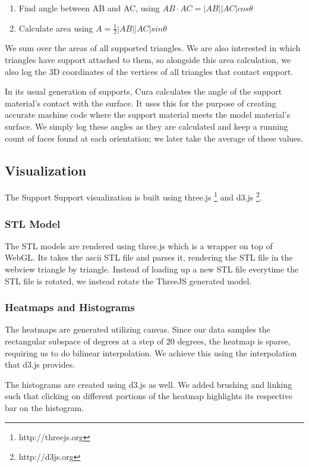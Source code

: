 \documentclass{sigchi}
\begin{document}
\begin{enumerate}
\item Find angle between AB and AC, using $AB \cdot AC = |AB||AC|cos\theta$
\item Calculate area using $A = \frac{1}{2}|AB||AC|sin\theta$
\end{enumerate}

We sum over the areas of all supported triangles.  We are also interested in which triangles have support attached to them, so alongside this area calculation, we also log the 3D coordinates of the vertices of all triangles that contact support.

In its usual generation of supports, Cura calculates the angle of the support material's contact with the surface.  It uses this for the purpose of creating accurate machine code where the support material meets the model material's surface.  We simply log these angles as they are calculated and keep a running count of faces found at each orientation; we later take the average of these values.

\subsection{Visualization}

The Support Support visualization is built using three.js \footnote{http://threejs.org} and d3.js \footnote{http://d3js.org}.

\subsubsection{STL Model}
The STL models are rendered using three.js which is a wrapper on top of WebGL. Its takes the ascii STL file and parses it, rendering the STL file in the webview triangle by triangle. Instead of loading up a new STL file everytime the STL file is rotated, we instead rotate the ThreeJS generated model. 

\subsubsection{Heatmaps and Histograms}
The heatmaps are generated utilizing canvas. Since our data samples the rectangular subspace of degrees at a step of 20 degrees, the heatmap is sparse, requiring us to do bilinear interpolation. We achieve this using the interpolation that d3.js provides.

The histograms are created using d3.js as well. We added brushing and linking such that clicking on different portions of the heatmap highlights its respective bar on the histogram.
\end{document}
